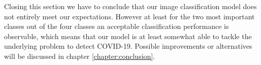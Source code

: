 Closing this section we have to conclude that our image classification model does not entirely meet our expectations. However at least for the two most important classes out of the four classes an acceptable classification performance is observable, which means that our model is at least somewhat able to tackle the underlying problem to detect COVID-19. Possible improvements or alternatives will be discussed in chapter \vref{chapter:conclusion}.

